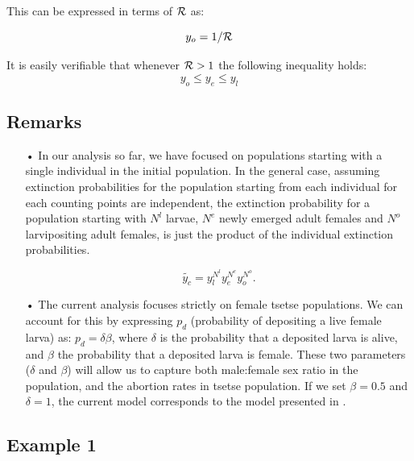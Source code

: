 \documentclass[smallextended]{svjour3}
\begin{document}
This can be expressed in terms of ${\cal R}$ as:

\begin{equation}
	\label{NewEqn4}
	y_o = 1/{\cal R}	
\end{equation}

It is easily verifiable that whenever ${\cal R}>1$ the following inequality holds:
\begin{equation}
	\label{Aretsetsetheorem}
	y_{o}\leq y_{e} \leq y_{l}
\end{equation} 


\subsection*{\bf Remarks}
\begin{itemize}
	\item[•] In our analysis so far, we have focused on populations starting with a single individual in the initial population. In the general case, assuming extinction probabilities for the population starting from each individual for each counting points are independent, the extinction probability for a population starting with $N^l$ larvae, $N^e$ newly emerged adult females and $N^o$ larvipositing adult females, is just the product of the individual extinction probabilities.
	
	$$\tilde{y_c}=y_l^{N^l} y_e^{N^e} y_o^{N^o}.$$

	\item[•] The current analysis focuses strictly on female tsetse populations. We can account for this  by expressing  $p_d$ (probability of depositing a live female larva) as:  $p_d =\delta \beta$, where $\delta$ is the probability that a deposited larva is alive, and $\beta$ the probability that a deposited larva is female.  These two parameters ($\delta$ and $\beta$) will allow us to capture both male:female sex ratio in the population, and  the abortion rates in tsetse population.  If we set $\beta = 0.5$ and $\delta = 1$, the current model corresponds to the model presented in \cite{Hargrove2005a}. 
\end{itemize}

\subsection{Example 1}
\end{document}
